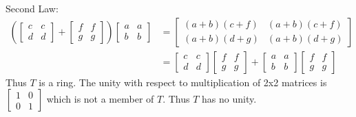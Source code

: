 \documentclass[paper=a4, fontsize=11pt]{jhwhw} %
\begin{document}
Second Law:
\begin{align}
\left(
\left[ \begin{array}{cc}
c & c \\
d & d \end{array} \right] +
\left[ \begin{array}{cc}
f & f \\
g & g \end{array} \right]\right)
\left[ \begin{array}{cc}
a & a \\
b & b \end{array} \right] &= 
\left[ \begin{array}{cc}
(a+b)(c+f) & (a+b)(c+f) \\
(a+b)(d+g) & (a+b)(d+g) \end{array} \right] \\
           &=
\left[ \begin{array}{cc}
c & c \\
d & d \end{array} \right]
\left[ \begin{array}{cc}
f & f \\
g & g \end{array} \right] + 
\left[ \begin{array}{cc}
a & a \\
b & b \end{array} \right] 
\left[ \begin{array}{cc}
f & f \\
g & g \end{array} \right]
\end{align}
Thus $T$ is a ring. The unity with respect to multiplication of 2x2 matrices is 
$
\left[ \begin{array}{cc}
1 & 0 \\
0 & 1 \end{array} \right]
$
 which is not a member of $T$. Thus $T$ has no unity.
\end{document}
